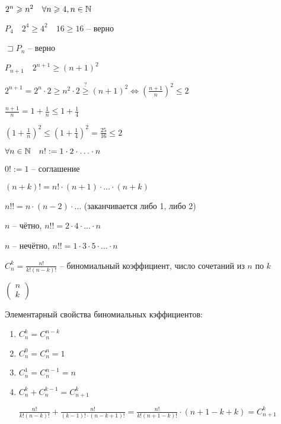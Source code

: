        \begin{example}
           $2^n\geqslant n^2\quad \forall n\geqslant 4, n\in \mathbb{N} $

           $P_4\quad 2^4\geqslant 4^2\quad 16\geqslant 16$ -- верно

           $\sqsupset P_n$ -- верно

           $P_{n+1}\quad 2^{n+1}\geqslant (n+1)^2$

           $2^{n+1} = 2^n\cdot 2 \geqslant  n^2\cdot 2 \overset{?}{\geqslant} (n+1)^2 \iff \left( \frac{n+1}{n} \right)^2 \leqslant 2  $

           $\frac{n+1}{n} = 1+\frac{1}{n}\leqslant 1+\frac{1}{4}$

           $\left( 1+\frac{1}{n} \right) ^2 \leqslant \left( 1+\frac{1}{4} \right) ^2 = \frac{25}{16}\leqslant 2$
       \end{example}


       \begin{definition}
           $\forall n\in \mathbb{N} \quad n! := 1\cdot 2\cdot \ldots\cdot n$

           $0! := 1$ -- соглашение

           $(n+k)! = n!\cdot (n+1) \cdot  \ldots \cdot  (n+k)$

           $n!! = n\cdot (n-2) \cdot  \ldots$ (заканчивается либо 1, либо 2)

           $n$ -- чётно, $n!! = 2\cdot 4\cdot \ldots\cdot n$

           $n$ -- нечётно, $n!! = 1\cdot 3\cdot 5\cdot \ldots\cdot n$
       \end{definition}

       \begin{definition}

           $C_n^k = \frac{n!}{k!(n-k)!}$ -- биномиальный коэффициент, число сочетаний из $n$ по $k$

           $\begin{pmatrix} n\\k \end{pmatrix} $
       \end{definition}
       Элементарный свойства биномиальных кэффициентов:
       \begin{enumerate}
           \item $C_n^k = C_n^{n-k}$
           \item $C_n^0 = C_n^n = 1$
           \item $C_n^1 = C_n^{n-1} = n$
           \item $C_n^k + C_n^{k-1} = C_{n+1}^k$

               $\frac{n!}{k!(n-k)!} + \frac{n!}{(k-1)!\cdot (n-k+1)!} = \frac{n!}{k!(n+1-k)!} \cdot  (n+1-k+k) = C_{n+1}^k$ 
       \end{enumerate}

